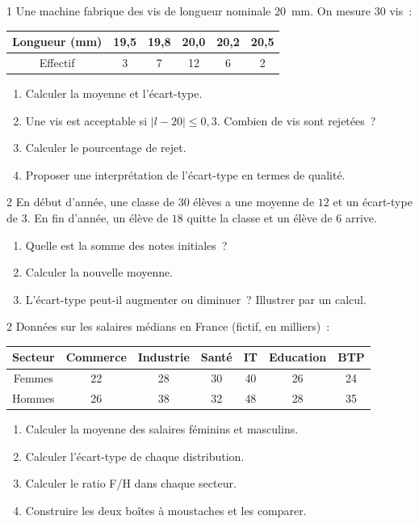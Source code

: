 \begin{probleme}{1}
Une machine fabrique des vis de longueur nominale $20$~mm.
On mesure $30$ vis~:
\begin{center}
\begin{tabular}{|c|c|c|c|c|c|}
\hline
\rowcolor{BN!10}
Longueur (mm) & 19,5 & 19,8 & 20,0 & 20,2 & 20,5 \\
\hline
Effectif & 3 & 7 & 12 & 6 & 2 \\
\hline
\end{tabular}
\end{center}
\begin{enumerate}
  \item Calculer la moyenne et l'\'ecart-type.
  \item Une vis est acceptable si $|l-20|\leq0{,}3$.
        Combien de vis sont rejet\'ees~?
  \item Calculer le pourcentage de rejet.
  \item Proposer une interpr\'etation de l'\'ecart-type en termes de qualit\'e.
\end{enumerate}
\end{probleme}

\begin{probleme}{2}
En d\'ebut d'ann\'ee, une classe de $30$ \'el\`eves a une moyenne de $12$
et un \'ecart-type de $3$. En fin d'ann\'ee, un \'el\`eve de $18$ quitte
la classe et un \'el\`eve de $6$ arrive.
\begin{enumerate}
  \item Quelle est la somme des notes initiales~?
  \item Calculer la nouvelle moyenne.
  \item L'\'ecart-type peut-il augmenter ou diminuer~?
        Illustrer par un calcul.
\end{enumerate}
\end{probleme}

\begin{probleme}{2}
Donn\'ees sur les salaires m\'edians en France (fictif, en milliers)~:
\begin{center}
\begin{tabular}{|c|cccccc|}
\hline
\rowcolor{BN!10}
Secteur & Commerce & Industrie & Sant\'e & IT & Education & BTP \\
\hline
Femmes & 22 & 28 & 30 & 40 & 26 & 24 \\
Hommes & 26 & 38 & 32 & 48 & 28 & 35 \\
\hline
\end{tabular}
\end{center}
\begin{enumerate}
  \item Calculer la moyenne des salaires f\'eminins et masculins.
  \item Calculer l'\'ecart-type de chaque distribution.
  \item Calculer le ratio F/H dans chaque secteur.
  \item Construire les deux bo\^ites \`a moustaches et les comparer.
\end{enumerate}
\end{probleme}

